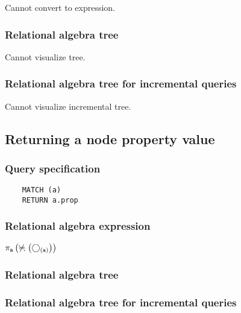	Cannot convert to expression.

	\subsubsection*{Relational algebra tree}

	Cannot visualize tree.

	\subsubsection*{Relational algebra tree for incremental queries}

	Cannot visualize incremental tree.
	\subsection{Returning a node property value}

	\subsubsection*{Query specification}

	\begin{lstlisting}
	MATCH (a)
	RETURN a.prop
	\end{lstlisting}


	\subsubsection*{Relational algebra expression}

	$\projection{\var{a}} \left(\alldifferent{} \left(\getvertices{a}{}\right)\right)$

	\subsubsection*{Relational algebra tree}


	\subsubsection*{Relational algebra tree for incremental queries}

